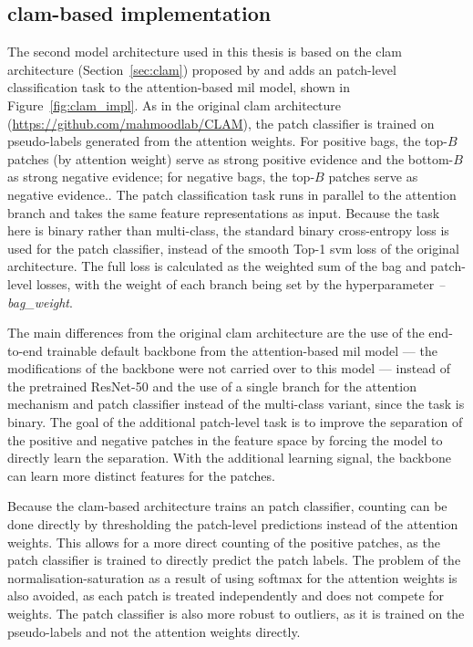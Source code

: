 \documentclass[12pt,parskip = half, DIV=classic,listof=totoc]{scrartcl}
\begin{document}
		\subsection{\acs*{clam}-based implementation}\label{sec:clam_impl}
			The second model architecture used in this thesis is based on the \ac{clam} architecture (Section~\ref{sec:clam}) proposed by \textcite{luDataEfficientWeakly2020} 
			and adds an patch-level classification task to the attention-based \ac{mil} model, shown in Figure~\ref{fig:clam_impl}. As in the original \ac{clam} architecture (\url{https://github.com/mahmoodlab/CLAM}), 
			the patch classifier is trained on pseudo-labels generated from the attention weights. For positive bags, the top-$B$ patches (by attention weight) serve as strong positive evidence and the bottom-$B$ 
			as strong negative evidence; for negative bags, the top-$B$ patches serve as negative evidence.. The patch classification task runs in parallel to the attention branch 
			and takes the same feature representations as input. Because the task here is binary rather than multi-class, the standard binary cross-entropy loss is used 
			for the patch classifier, instead of the smooth Top-1 \ac{svm} loss of the original architecture. The full loss is
			calculated as the weighted sum of the bag and patch-level losses, with the weight of each branch being set by the hyperparameter \textit{--bag\_weight}.
			
			The main differences from the original \ac{clam} architecture are the use of the end-to-end trainable default backbone from the attention-based \ac{mil} model --- 
			the modifications of the backbone were not carried over to this model --- instead of 
			the pretrained ResNet-50 and the use of a single branch for the attention mechanism and patch classifier instead of the multi-class variant, since the task is binary.
			The goal of the additional patch-level task is to improve the separation of the positive and negative patches in the feature space
			by forcing the model to directly learn the separation. With the additional learning signal, the backbone can learn 
			more distinct features for the patches. 

			Because the \acs*{clam}-based architecture trains an patch classifier, counting can be done directly by thresholding the patch-level predictions instead of the attention
			weights. This allows for a more direct counting of the positive patches, as the patch classifier is trained to directly predict the patch labels. The problem of the 
			normalisation-saturation as a result of using softmax for the attention weights is also avoided, as each patch is treated independently and does not 
			compete for weights. The patch classifier is also more robust to outliers, as it is trained on the pseudo-labels and not the attention weights directly.
\end{document}
